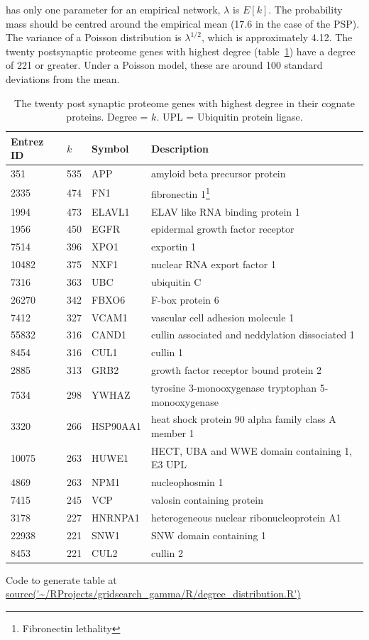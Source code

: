 has only one parameter for an empirical network, $\lambda$ is $E[k]$.  The probability mass should be centred around the empirical mean  (17.6 in the case of the PSP). The variance of a Poisson distribution is $\lambda^{1/2}$, which is approximately 4.12. The twenty postsynaptic proteome genes with highest degree (table~\ref{tab:The 20 post synaptic proteome genes with highest degree in their cognate proteins.}) have a degree of 221 or greater. Under a Poisson model, these are around 100 standard deviations from the mean. 
\begin{table}[ht]
\centering
\setlength{\extrarowheight}{2pt}
{
\begin{tabular}{@{}llll@{}}
  \toprule
Entrez ID &  $k$ & Symbol & Description \\ 
\midrule
351 & 535 & APP & amyloid beta precursor protein \\ 
  2335 & 474 & FN1 & fibronectin 1\footnote{Fibronectin lethality} \\ 
  1994 & 473 & ELAVL1 & ELAV like RNA binding protein 1 \\ 
  1956 & 450 & EGFR & epidermal growth factor receptor \\ 
  7514 & 396 & XPO1 & exportin 1 \\ 
  10482 & 375 & NXF1 & nuclear RNA export factor 1 \\ 
  7316 & 363 & UBC & ubiquitin C \\ 
  26270 & 342 & FBXO6 & F-box protein 6 \\ 
  7412 & 327 & VCAM1 & vascular cell adhesion molecule 1 \\ 
  55832 & 316 & CAND1 & cullin associated and neddylation dissociated 1 \\ 
  8454 & 316 & CUL1 & cullin 1 \\ 
  2885 & 313 & GRB2 & growth factor receptor bound protein 2 \\ 
  7534 & 298 & YWHAZ & tyrosine 3-monooxygenase tryptophan 5-monooxygenase \\
  3320 & 266 & HSP90AA1 & heat shock protein 90 alpha family class A member 1 \\ 
  10075 & 263 & HUWE1 & HECT, UBA and WWE domain containing 1, E3 UPL \\ 
  4869 & 263 & NPM1 & nucleophosmin 1 \\ 
  7415 & 245 & VCP & valosin containing protein \\ 
  3178 & 227 & HNRNPA1 & heterogeneous nuclear ribonucleoprotein A1 \\ 
  22938 & 221 & SNW1 & SNW domain containing 1 \\ 
  8453 & 221 & CUL2 & cullin 2 \\ 
   \bottomrule
\end{tabular}
}
\caption{The twenty post synaptic proteome genes with highest degree in their cognate proteins. Degree = $k$. UPL = Ubiquitin protein ligase.}  
\tiny Code to generate table at \url{source('~/RProjects/gridsearch_gamma/R/degree_distribution.R')}
\label{tab:The 20 post synaptic proteome genes with highest degree in their cognate proteins.}
\end{table}

